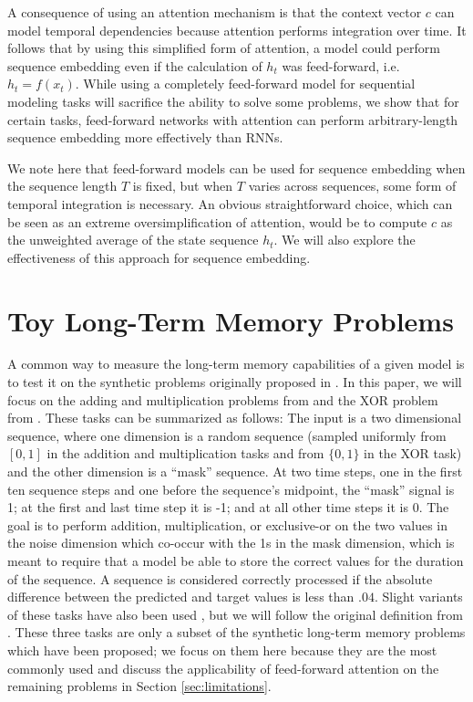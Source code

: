 \documentclass{article} %
\begin{document}
A consequence of using an attention mechanism is that the context vector $c$ can model temporal dependencies because attention performs integration over time.
It follows that by using this simplified form of attention, a model could perform sequence embedding even if the calculation of $h_t$ was feed-forward, i.e.\ $h_t = f(x_t)$.
While using a completely feed-forward model for sequential modeling tasks will sacrifice the ability to solve some problems, we show that for certain tasks, feed-forward networks with attention can perform arbitrary-length sequence embedding more effectively than RNNs.

We note here that feed-forward models can be used for sequence embedding when the sequence length $T$ is fixed, but when $T$ varies across sequences, some form of temporal integration is necessary.
An obvious straightforward choice, which can be seen as an extreme oversimplification of attention, would be to compute $c$ as the unweighted average of the state sequence $h_t$.
We will also explore the effectiveness of this approach for sequence embedding.

\section{Toy Long-Term Memory Problems}

A common way to measure the long-term memory capabilities of a given model is to test it on the synthetic problems originally proposed in \cite{hochreiter1997long}.
In this paper, we will focus on the adding and multiplication problems from \cite{hochreiter1997long} and the XOR problem from \cite{martens2011learning}.
These tasks can be summarized as follows:
The input is a two dimensional sequence, where one dimension is a random sequence (sampled uniformly from $[0, 1]$ in the addition and multiplication tasks and from $\{0, 1\}$ in the XOR task) and the other dimension is a ``mask'' sequence.
At two time steps, one in the first ten sequence steps and one before the sequence's midpoint, the ``mask'' signal is 1; at the first and last time step it is -1; and at all other time steps it is 0.
The goal is to perform addition, multiplication, or exclusive-or on the two values in the noise dimension which co-occur with the 1s in the mask dimension, which is meant to require that a model be able to store the correct values for the duration of the sequence.
A sequence is considered correctly processed if the absolute difference between the predicted and target values is less than $.04$.
Slight variants of these tasks have also been used \cite{sutskever2013importance,le2015simple,jaegar2012long,martens2011learning}, but we will follow the original definition from \cite{hochreiter1997long}.
These three tasks are only a subset of the synthetic long-term memory problems which have been proposed; we focus on them here because they are the most commonly used and discuss the applicability of feed-forward attention on the remaining problems in Section \ref{sec:limitations}.
\end{document}
